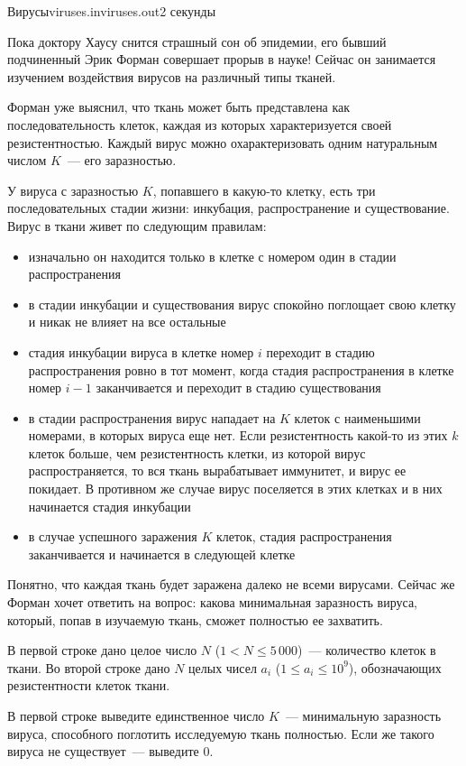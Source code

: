 \begin{problem}{Вирусы}{viruses.in}{viruses.out}{2 секунды}


Пока доктору Хаусу снится страшный сон об эпидемии, его бывший подчиненный Эрик Форман совершает прорыв в науке! 
Сейчас он занимается изучением воздействия вирусов на различный типы тканей.

Форман уже выяснил, что ткань может быть представлена как последовательность клеток, каждая из которых характеризуется своей резистентностью.
Каждый вирус можно охарактеризовать одним натуральным числом $K$~--- его заразностью. 

У вируса с заразностью $K$, попавшего в какую-то клетку, есть три последовательных стадии жизни: инкубация, распространение и существование. Вирус в 
ткани живет по следующим правилам:
\begin{itemize}
\item изначально он находится только в клетке с номером один в стадии распространения
\item в стадии инкубации и существования вирус спокойно поглощает свою клетку и никак не влияет на все остальные
\item стадия инкубации вируса в клетке номер $i$ переходит в стадию распространения ровно в тот момент, когда стадия распространения в клетке номер 
$i - 1$ заканчивается и переходит в стадию существования
\item в стадии распространения вирус нападает на $K$ клеток с наименьшими номерами, в которых вируса еще нет. Если резистентность какой-то из этих 
$k$ клеток больше, чем резистентность клетки, из которой вирус распространяется, то вся ткань вырабатывает иммунитет, и вирус ее покидает. В противном 
же случае вирус поселяется в этих клетках и в них начинается стадия инкубации
\item в случае успешного заражения $K$ клеток, стадия распространения заканчивается и начинается в следующей клетке
\end{itemize}

Понятно, что каждая ткань будет заражена далеко не всеми вирусами. Сейчас же Форман хочет ответить на вопрос: какова минимальная заразность вируса, 
который, попав в изучаемую ткань, сможет полностью ее захватить.

\InputFile
В первой строке дано целое число $N$ ($1 < N \le 5{\,}000$)~--- количество клеток в ткани. Во второй строке дано $N$ целых чисел $a_i$ 
($1 \le a_i \le 10^9$), обозначающих резистентности клеток ткани.

\OutputFile               
В первой строке выведите единственное число $K$~--- минимальную заразность вируса, способного поглотить исследуемую ткань полностью. Если же такого 
вируса не существует~--- выведите 0.

\Examples
\begin{example}%
%
%
\end{example}

\end{problem}
